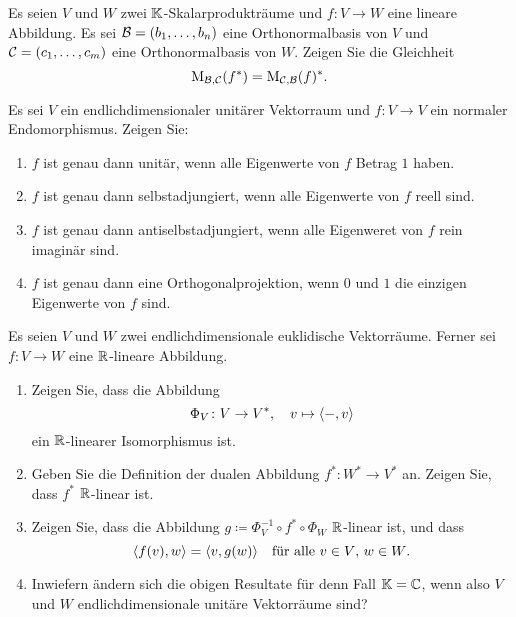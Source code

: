 \documentclass[a4paper,10pt]{scrartcl}
\begin{document}


\begin{question}
  Es seien $V$ und $W$ zwei $\mathbb{K}$-Skalarprodukträume und $f \colon V \to W$ eine lineare Abbildung.
  Es sei $\mathcal{B} = (b_1, \dotsc, b_n)$ eine Orthonormalbasis von $V$ und $\mathcal{C} = (c_1, \dotsc, c_m)$ eine Orthonormalbasis von $W$.
  Zeigen Sie die Gleichheit
  \[
      \operatorname{M}_{\mathcal{B}, \mathcal{C}}(f^*)
    = \operatorname{M}_{\mathcal{C}, \mathcal{B}}(f)^*.
  \]
\end{question}


\begin{question}
  Es sei $V$ ein endlichdimensionaler unitärer Vektorraum und $f \colon V \to V$ ein normaler Endomorphismus.
  Zeigen Sie:
  \begin{enumerate}
    \item
      $f$ ist genau dann unitär, wenn alle Eigenwerte von $f$ Betrag $1$ haben.
    \item
      $f$ ist genau dann selbstadjungiert, wenn alle Eigenwerte von $f$ reell sind.
    \item
      $f$ ist genau dann antiselbstadjungiert, wenn alle Eigenweret von $f$ rein imaginär sind.
    \item
      $f$ ist genau dann eine Orthogonalprojektion, wenn $0$ und $1$ die einzigen Eigenwerte von $f$ sind.
  \end{enumerate}
\end{question}


\begin{question}
  Es seien $V$ und $W$ zwei endlichdimensionale euklidische Vektorräume.
  Ferner sei $f \colon V \to W$ eine $\mathbb{R}$-lineare Abbildung.
  \begin{enumerate}[leftmargin=*]
    \item
      Zeigen Sie, dass die Abbildung
      \[
        \Phi_V \colon V \to V^*,
        \quad
        v \mapsto \langle -, v \rangle
      \]
      ein $\mathbb{R}$-linearer Isomorphismus ist.
    \item
      Geben Sie die Definition der dualen Abbildung $f^* \colon W^* \to V^*$ an.
      Zeigen Sie, dass $f^*$ $\mathbb{R}$-linear ist.
    \item
      Zeigen Sie, dass die Abbildung $g \coloneqq \Phi_V^{-1} \circ f^* \circ \Phi_W$ $\mathbb{R}$-linear ist, und dass
      \[
        \langle f(v), w \rangle = \langle v, g(w) \rangle
        \quad
        \text{für alle $v \in V$, $w \in W$}.
      \]
    \item
      Inwiefern ändern sich die obigen Resultate für denn Fall $\mathbb{K} = \mathbb{C}$, wenn also $V$ und $W$ endlichdimensionale unitäre Vektorräume sind?
  \end{enumerate}
\end{question}
\end{document}
